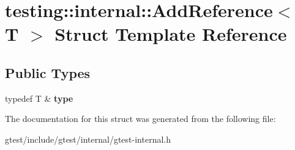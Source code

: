 \hypertarget{structtesting_1_1internal_1_1AddReference}{}\section{testing\+:\+:internal\+:\+:Add\+Reference$<$ T $>$ Struct Template Reference}
\label{structtesting_1_1internal_1_1AddReference}
\subsection*{Public Types}
\begin{DoxyCompactItemize}
\item 
\mbox{\label{structtesting_1_1internal_1_1AddReference_a2df8dd7c4e41f6390e6e66b1a9a67bb4}} 
typedef T \& {\bfseries type}
\end{DoxyCompactItemize}


The documentation for this struct was generated from the following file\+:\begin{DoxyCompactItemize}
\item 
gtest/include/gtest/internal/gtest-\/internal.\+h\end{DoxyCompactItemize}
